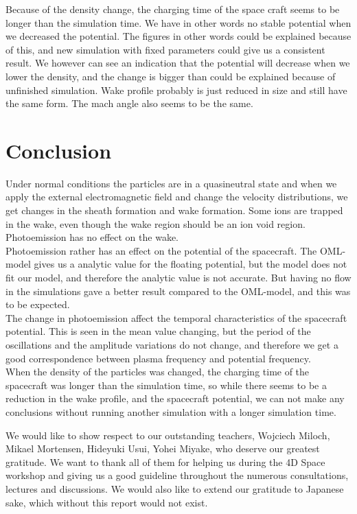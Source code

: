 \documentclass[aip, 
rsi, 
amsmath,
amssymb,
longbibliography,
preprint]{revtex4-1}
\begin{document}
Because of the density change, the charging time of the space craft seems to be longer than the simulation time. We have in other words no stable potential when we decreased the potential. The figures in other words could be explained because of this, and new simulation with fixed parameters could give us a consistent result. We however can see an indication that the potential will decrease when we lower the density, and the change is bigger than could be explained because of unfinished simulation. Wake profile probably is just reduced in size and still have the same form. The mach angle also seems to be the same. 

\section{Conclusion}
Under normal conditions the particles are in a quasineutral state and when we apply the external electromagnetic field and change the velocity distributions, we get changes in the sheath formation and wake formation. Some ions are trapped in the wake, even though the wake region should be an ion void region. Photoemission has no effect on the wake. \\

Photoemission rather has an effect on the potential of the spacecraft. The OML-model gives us a analytic value for the floating potential, but the model does not fit our model, and therefore the analytic value is not accurate. But having no flow in the simulations gave a better result compared to the OML-model, and this was to be expected. \\

The change in photoemission affect the temporal characteristics of the spacecraft potential. This is seen in the mean value changing, but the period of the oscillations and the amplitude variations do not change, and therefore we get a good correspondence between plasma frequency and potential frequency. \\

When the density of the particles was changed, the charging time of the spacecraft was longer than the simulation time, so while there seems to be a reduction in the wake profile, and the spacecraft potential, we can not make any conclusions without running another simulation with a longer simulation time.

\begin{acknowledgments}
We would like to show respect to our outstanding teachers, Wojciech Miloch, Mikael Mortensen, Hideyuki Usui, Yohei Miyake, who deserve our greatest gratitude. We want to thank all of them for helping us during the 4D Space workshop and giving us a good guideline throughout the numerous consultations, lectures and discussions. We would also like to extend our gratitude to Japanese sake, which without this report would not exist.
\end{acknowledgments}


\end{document}

